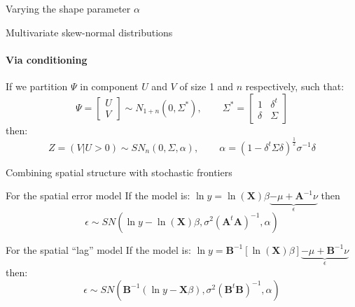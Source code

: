 \documentclass[presentation]{beamer}
\begin{document}
\begin{frame}{Varying the shape parameter $\alpha$}
\begin{figure}[h]
\center
{}
\label{fig:sn5}
\end{figure}
\end{frame}

\begin{frame}{Multivariate skew-normal distributions}
\framesubtitle{Via conditioning}
If we partition $\Psi$ in component $U$ and $V$ of size 1 and $n$ respectively, such that:
\begin{equation*}
	\Psi = \begin{bmatrix}
	U \\ V
	\end{bmatrix} \sim N_{1+n}(0,\Sigma^*), \hspace{25pt} \Sigma^* = \begin{bmatrix}
	1 & \delta^t \\
	\delta & \Sigma
	\end{bmatrix}
\end{equation*}
then:
\begin{equation*}
	Z = (V|U>0 )\sim SN_n(0,\Sigma, \alpha), \hspace{25pt} \alpha = (1-\delta^t \Sigma \delta)^\frac{1}{2} \sigma^{-1}\delta
\end{equation*}
\end{frame}

\begin{frame}{Combining spatial structure with stochastic frontiers}

\begin{block}{For the spatial error model}
	If the model is: $\ln y = \ln(\mathbf{X}) \beta \underbrace{- \mu +  \mathbf{A}^{-1}\nu}_\epsilon$ then
	\begin{equation*}
	\epsilon  \sim SN(\ln y - \ln(\mathbf{X}) \beta, \sigma^2 (\mathbf{A}^t \mathbf{A})^{-1}, \alpha)
	\end{equation*}
\end{block}

\begin{block}{For the spatial ``lag'' model}
	If the model is: $\ln y =  \mathbf{B}^{-1}\left[\ln(\mathbf{X}) \beta\right] \underbrace{ - \mu+ \mathbf{B}^{-1}\nu}_{\epsilon}$ then:
	\begin{equation*}
		\epsilon \sim  SN(\mathbf{B}^{-1}(\ln y - \mathbf{X}\beta), \sigma^2 (\mathbf{B}^t \mathbf{B})^{-1}, \alpha)
	\end{equation*}
\end{block}


\end{frame}
\end{document}
